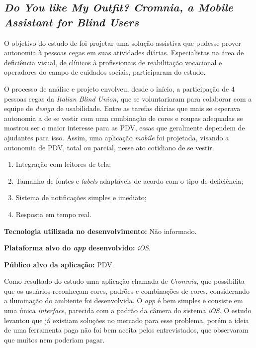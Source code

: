 \subsection{\emph{Do You like My Outfit? Cromnia, a Mobile Assistant for Blind Users}}

O objetivo do estudo de  foi projetar uma solução assistiva que pudesse prover autonomia à pessoas cegas em suas atividades diárias.
Especialistas na área de deficiência visual, de clínicos à profissionais de reabilitação vocacional e operadores do campo de cuidados sociais, participaram do estudo.


O processo de análise e projeto envolveu, desde o início, a participação de 4 pessoas cegas da \emph{Italian Blind Union}, que se voluntariaram para colaborar com a equipe de \emph{design} de usabilidade.
Entre as tarefas diárias que mais se esperava autonomia a de se vestir com uma combinação de cores e roupas adequadas se mostrou ser o maior interesse para as PDV, essas que geralmente dependem de ajudantes para isso.
Assim, uma aplicação \emph{mobile} foi projetada, visando a autonomia de PDV, total ou parcial, nesse ato cotidiano de se vestir.

\begin{enumerate}
    \item Integração com leitores de tela;
    \item Tamanho de fontes e \emph{labels} adaptáveis de acordo com o tipo de deficiência;
    \item Sistema de notificações simples e imediato;
    \item Resposta em tempo real.
\end{enumerate}

\textbf{Tecnologia utilizada no desenvolvimento:} Não informado.

\textbf{Plataforma alvo do \emph{app} desenvolvido:} \emph{iOS}.

\textbf{Público alvo da aplicação:} PDV\@.

Como resultado do estudo uma aplicação chamada de \emph{Cromnia}, que possibilita que os usuários reconheçam cores, padrões e combinações de cores, considerando a iluminação do ambiente foi desenvolvida.
O \emph{app} é bem simples e consiste em uma única \emph{interface}, parecida com a padrão da câmera do sistema \emph{iOS}.
O estudo levantou que já existiam soluções no mercado para esse problema, porém a ideia de uma ferramenta paga não foi bem aceita pelos entrevistados, que observaram que muitos nem poderiam pagar.

